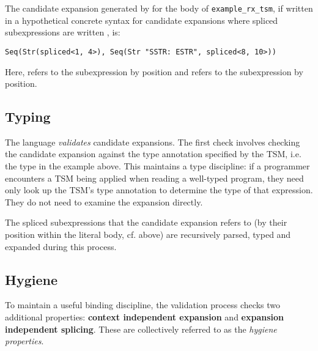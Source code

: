 The candidate expansion generated by  for the body of \lstinline{example_rx_tsm}, if written in a hypothetical concrete syntax for candidate expansions where spliced subexpressions are written , is:
\begin{lstlisting}[numbers=none]
Seq(Str(spliced<1, 4>), Seq(Str "SSTR: ESTR", spliced<8, 10>))
\end{lstlisting}
Here,  refers to the subexpression  by position and  refers to the subexpression  by position. 


\subsection{Typing}\label{sec:uetsms-validation}
The language \emph{validates} candidate expansions. The first check involves checking the candidate expansion against the type annotation specified by the TSM, i.e. the type  in the example above. This maintains a type discipline: if a programmer encounters a TSM being applied when reading a well-typed program, they need only look up the TSM's type annotation to determine the type of that expression. They do not need to examine the expansion directly. 

The spliced subexpressions that the candidate expansion refers to (by their position within the literal body, cf. above) are recursively parsed, typed and expanded during this process.

\subsection{Hygiene}
To maintain a useful binding discipline, the validation process checks two additional properties: \textbf{context independent expansion} and \textbf{expansion independent splicing}. These are collectively referred to as the \emph{hygiene properties}.


